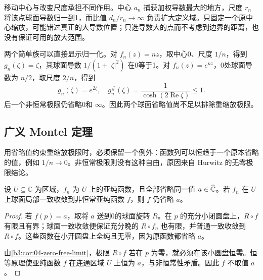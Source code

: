 移动中心与改变尺度承担不同作用。中心 \(a_n\) 捕获加权导数最大的地方，尺度 \(r_n\) 将该点球面导数归一到1，而比值 \(d_n/r_n\to\infty\) 负责扩大定义域。只固定一个原中心缩放，可能错过真正的大导数位置；只选导数大的点而不考虑到边界的距离，也没有保证可用的放大范围。

\ProseParagraphBreak
两个简单族可以直接显示归一化。对 \(f_n(z)=nz\)，取中心0、尺度 \(1/n\)，得到 \(g_n(\zeta)=\zeta\)，其球面导数 \(1/(1+|\zeta|^2)\) 在0等于1。对 \(f_n(z)=e^{nz}\)，0处球面导数为 \(n/2\)，取尺度 \(2/n\)，得到
\[
 g_n(\zeta)=e^{2\zeta},\quad
 g_n^\#(\zeta)=\frac1{\cosh(2\operatorname{Re}\zeta)}\le1.
\]
后一个非恒常极限仍省略0和 \(\infty\)。因此两个球面省略值尚不足以排除重缩放极限。

\subsection{广义 Montel 定理}
\label{b3:subsec:140304}

用省略值约束重缩放极限时，必须保留一个例外：函数列可以恒趋于一个原本省略的值，例如 \(1/n\to0\)。非恒常极限则没有这种自由，原因来自 Hurwitz 的无零极限结论。

\begin{lemma}[非恒常极限保留省略值]\label{b3:lem:14-omitted-limit}
设 \(U\subseteq\mathbb C\) 为区域，\(f_n\) 为 \(U\) 上的亚纯函数，且全部省略同一值 \(a\in\widehat{\mathbb C\kern0pt}\)。若 \(f_n\) 在 \(U\) 上球面局部一致收敛到非恒常亚纯函数 \(f\)，则 \(f\) 仍省略 \(a\)。
\end{lemma}
\begin{proof}
若 \(f(p)=a\)，取将 \(a\) 送到0的球面旋转 \(R\)。在 \(p\) 的充分小闭圆盘上，\(R\circ f\) 有限且有界；球面一致收敛便保证充分晚的 \(R\circ f_n\) 也有限，并普通一致收敛到 \(R\circ f\)。这些函数在小开圆盘上全纯且无零，因为原函数都省略 \(a\)。

由\cref{b3:cor:04-zero-free-limit}，极限 \(R\circ f\) 若在 \(p\) 为零，就必须在该小圆盘恒零。恒等原理使亚纯函数 \(f\) 在连通区域 \(U\) 上恒为 \(a\)，与非恒常性矛盾。因此 \(f\) 不取值 \(a\)。
\end{proof}

